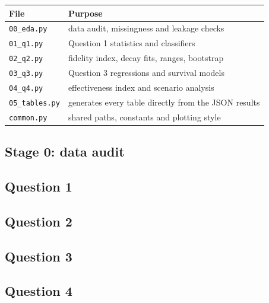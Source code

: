 \documentclass{apmcmthesis}
\begin{document}
\begin{center}
\footnotesize
\begin{tabular}{ll}
\toprule
File & Purpose\\
\midrule
\texttt{00\_eda.py} & data audit, missingness and leakage checks\\
\texttt{01\_q1.py} & Question 1 statistics and classifiers\\
\texttt{02\_q2.py} & fidelity index, decay fits, ranges, bootstrap\\
\texttt{03\_q3.py} & Question 3 regressions and survival models\\
\texttt{04\_q4.py} & effectiveness index and scenario analysis\\
\texttt{05\_tables.py} & generates every table directly from the JSON results\\
\texttt{common.py} & shared paths, constants and plotting style\\
\bottomrule
\end{tabular}
\end{center}

\subsection{Stage 0: data audit}


\subsection{Question 1}


\subsection{Question 2}


\subsection{Question 3}


\subsection{Question 4}

\end{document}
